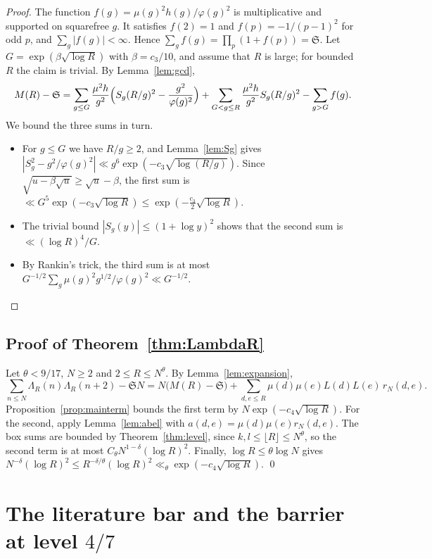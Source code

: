 \documentclass[11pt]{amsart}
\theoremstyle{definition}
\theoremstyle{remark}
\numberwithin{equation}{section}
\begin{document}
\begin{proof}
The function $f(g)=\mu(g)^2h(g)/\varphi(g)^2$ is multiplicative and
supported on squarefree $g$.  It satisfies $f(2)=1$ and
$f(p)=-1/(p-1)^2$ for odd $p$, and $\sum_g|f(g)|<\infty$.  Hence
$\sum_gf(g)=\prod_p(1+f(p))=\mathfrak S$.  Let $G=\exp(\beta\sqrt{\log R})$
with $\beta=c_3/10$, and assume that $R$ is large; for bounded $R$ the claim
is trivial.  By Lemma~\ref{lem:gcd},
\[
 M(R)-\mathfrak S=
 \sum_{g\le G}\frac{\mu^2h}{g^2}\Bigl(S_g(R/g)^2-\frac{g^2}{\varphi(g)^2}\Bigr)
 +\sum_{G<g\le R}\frac{\mu^2h}{g^2}S_g(R/g)^2
 -\sum_{g>G}f(g).
\]
We bound the three sums in turn.
\begin{itemize}
\item For $g\le G$ we have $R/g\ge2$, and Lemma~\ref{lem:Sg} gives
$|S_g^2-g^2/\varphi(g)^2|\ll g^6\exp(-c_3\sqrt{\log(R/g)})$.  Since
$\sqrt{u-\beta\sqrt u}\ge\sqrt u-\beta$, the first sum is
$\ll G^5\exp(-c_3\sqrt{\log R})\le\exp(-\tfrac{c_3}2\sqrt{\log R})$.
\item The trivial bound $|S_g(y)|\le(1+\log y)^2$ shows that the second sum
is $\ll(\log R)^4/G$.
\item By Rankin's trick, the third sum is at most
$G^{-1/2}\sum_g\mu(g)^2g^{1/2}/\varphi(g)^2\ll G^{-1/2}$.
\end{itemize}
\end{proof}

\subsection{Proof of Theorem~\ref{thm:LambdaR}}
Let $\theta<9/17$, $N\ge2$ and $2\le R\le N^\theta$.  By
Lemma~\ref{lem:expansion},
\[
 \sum_{n\le N}\Lambda_R(n)\Lambda_R(n+2)-\mathfrak SN
 =N\bigl(M(R)-\mathfrak S\bigr)
 +\sum_{d,e\le R}\mu(d)\mu(e)L(d)L(e)\,r_N(d,e).
\]
Proposition~\ref{prop:mainterm} bounds the first term by
$N\exp(-c_4\sqrt{\log R})$.  For the second, apply Lemma~\ref{lem:abel} with
$a(d,e)=\mu(d)\mu(e)r_N(d,e)$.  The box sums are bounded by
Theorem~\ref{thm:level}, since $k,l\le\lfloor R\rfloor\le N^\theta$, so the
second term is at most $C_\theta N^{1-\delta}(\log R)^2$.  Finally, $\log
R\le\theta\log N$ gives
$N^{-\delta}(\log R)^2\le R^{-\delta/\theta}(\log R)^2\ll_\theta
\exp(-c_4\sqrt{\log R})$.
\qed

\section{The literature bar and the barrier at level $4/7$}\label{sec:barrier}
\end{document}
